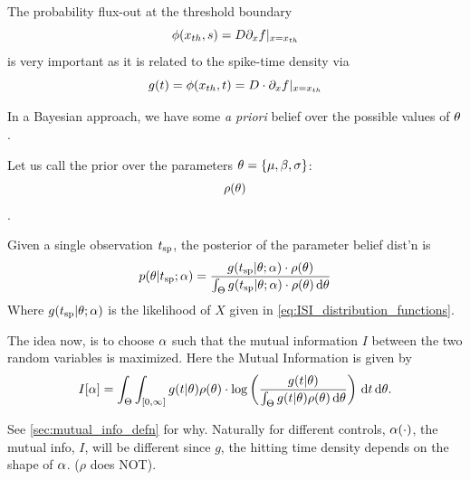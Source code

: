 \documentclass{article}
\begin{document}
The probability flux-out at the threshold boundary $$\phi({ x_{th} }, s) = D
{\partial}_xf |_{x={ x_{th} }}$$ is very important as it is related to the spike-time density
via $$g( t)  = \phi({ x_{th} }, t) = D\cdot {\partial}_x f|_{x={ x_{th} }}$$
 
% 
% 
% 

In a Bayesian approach, we have some {\sl a priori} belief over the possible
values of ${\theta}$.

Let us call the prior over the parameters ${\theta} = \{{\mu }, {\beta}, {\sigma }\}$:
$$\rho({\theta})$$.

Given a single observation ${ t_{\textrm{sp} } }$, the posterior of the parameter belief dist'n
is 
\begin{equation}
p({\theta}| { t_{\textrm{sp} } }; {\alpha}) =
\frac{g({ t_{\textrm{sp} } } |{\theta}; {\alpha})\cdot \rho({\theta})}{\int_\Theta g({ t_{\textrm{sp} } }|{\theta}; {\alpha})\cdot \rho({\theta})
\, \mathrm{d} {\theta}}
\label{eq:parameter_posterior_defn}
\end{equation} 
Where $ g( { t_{\textrm{sp} } } |{\theta}; {\alpha})$ is the likelihood of $X$ given in
\cref{eq:ISI_distribution_functions}.

The idea now, is to choose ${\alpha}$ such that the mutual information $I$ between the
two random variables is maximized. Here the Mutual Information is given by
\begin{equation}
I[{\alpha}]= 
\int_\Theta \int_{[0, \infty]} g(t|{\theta})\rho({\theta}) \cdot 
\log \left( \frac{g(t|{\theta})}
{\int_\Theta g(t|{\theta})\rho({\theta}) \, \mathrm{d} {\theta}   } \right)
\, \mathrm{d} t\, \mathrm{d} {\theta}.
\label{eq:J_mutual_info_objective}
\end{equation}

See \cref{sec:mutual_info_defn} for why. 
Naturally for different controls, ${\alpha}(\cdot)$, the mutual info, $I$, will
be different since $g$, the hitting time density depends on the shape of ${\alpha}$.
($\rho$ does NOT).
\end{document}
